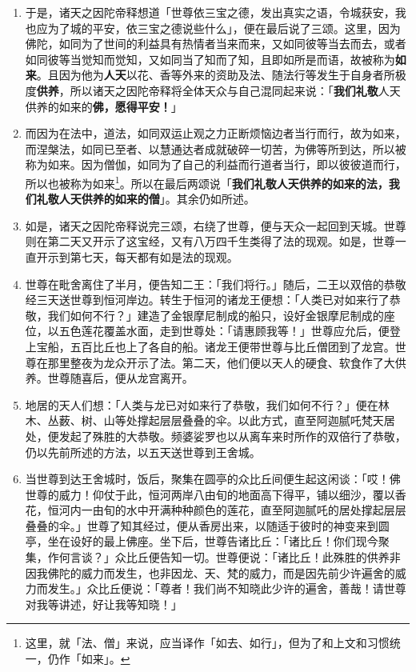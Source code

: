 \begin{enumerate}\item 于是，诸天之因陀帝释想道「世尊依三宝之德，发出真实之语，令城获安，我也应为了城的平安，依三宝之德说些什么」，便在最后说了三颂。这里，因为佛陀，如同为了世间的利益具有热情者当来而来，又如同彼等当去而去，或者如同彼等当觉知而觉知，又如同当了知而了知，且即如所是而语，故被称为\textbf{如来}。且因为他为\textbf{人天}以花、香等外来的资助及法、随法行等发生于自身者所极度\textbf{供养}，所以诸天之因陀帝释将全体天众与自己混同起来说：「\textbf{我们礼敬}人天供养的如来的\textbf{佛，愿得平安！}」
\item 而因为在法中，道法，如同双运止观之力正断烦恼边者当行而行，故为如来，而涅槃法，如同已至者、以慧通达者成就破碎一切苦，为佛等所到达，所以被称为如来。因为僧伽，如同为了自己的利益而行道者当行，即以彼彼道而行，所以也被称为如来\footnote{这里，就「法、僧」来说，应当译作「如去、如行」，但为了和上文和习惯统一，仍作「如来」。}。所以在最后两颂说「\textbf{我们礼敬人天供养的如来的法，我们礼敬人天供养的如来的僧}」。其余仍如所述。
\item 如是，诸天之因陀帝释说完三颂，右绕了世尊，便与天众一起回到天城。世尊则在第二天又开示了这宝经，又有八万四千生类得了法的现观。如是，世尊一直开示到第七天，每天都有如是法的现观。
\item 世尊在毗舍离住了半月，便告知二王：「我们将行。」随后，二王以双倍的恭敬经三天送世尊到恒河岸边。转生于恒河的诸龙王便想：「人类已对如来行了恭敬，我们如何不行？」建造了金银摩尼制成的船只，设好金银摩尼制成的座位，以五色莲花覆盖水面，走到世尊处：「请惠顾我等！」世尊应允后，便登上宝船，五百比丘也上了各自的船。诸龙王便带世尊与比丘僧团到了龙宫。世尊在那里整夜为龙众开示了法。第二天，他们便以天人的硬食、软食作了大供养。世尊随喜后，便从龙宫离开。
\item 地居的天人们想：「人类与龙已对如来行了恭敬，我们如何不行？」便在林木、丛薮、树、山等处撑起层层叠叠的伞。以此方式，直至阿迦腻吒梵天居处，便发起了殊胜的大恭敬。频婆娑罗也以从离车来时所作的双倍行了恭敬，仍以先前所述的方法，以五天送世尊到王舍城。
\item 当世尊到达王舍城时，饭后，聚集在圆亭的众比丘间便生起这闲谈：「哎！佛世尊的威力！仰仗于此，恒河两岸八由旬的地面高下得平，铺以细沙，覆以香花，恒河内一由旬的水中开满种种颜色的莲花，直至阿迦腻吒的居处撑起层层叠叠的伞。」世尊了知其经过，便从香房出来，以随适于彼时的神变来到圆亭，坐在设好的最上佛座。坐下后，世尊告诸比丘：「诸比丘！你们现今聚集，作何言谈？」众比丘便告知一切。世尊便说：「诸比丘！此殊胜的供养非因我佛陀的威力而发生，也非因龙、天、梵的威力，而是因先前少许遍舍的威力而发生。」众比丘便说：「尊者！我们尚不知晓此少许的遍舍，善哉！请世尊对我等讲述，好让我等知晓！」

\end{enumerate}
